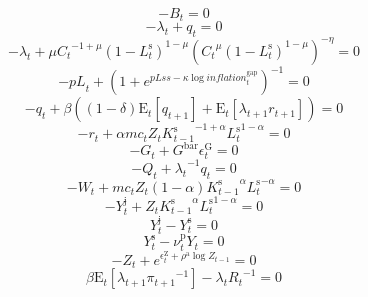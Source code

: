 \begin{equation}
-B_{t} = 0
\end{equation}
\begin{equation}
-\lambda_{t} + q_{t} = 0
\end{equation}
\begin{equation}
-\lambda_{t} + {\mu} {{C_{t}}^{-1 + \mu}} {\left(1 - L^{\mathrm{s}}_{t}\right)^{1 - \mu}} {\left({{C_{t}}^{\mu}} {\left(1 - L^{\mathrm{s}}_{t}\right)^{1 - \mu}}\right)^{-\eta}} = 0
\end{equation}
\begin{equation}
-{p\!L}_{t} + \left(1 + e^{{p\!L\!s\!s} - {\kappa} {\log{{i\!n\!f\!l\!a\!t\!i\!o\!n}^{\mathrm{gap}}_{t}}}}\right)^{-1} = 0
\end{equation}
\begin{equation}
-q_{t} + {\beta} \left(\left(1 - \delta\right) {\mathrm{E}_{t}\left[q_{t+1}\right]} + \mathrm{E}_{t}\left[{\lambda_{t+1}} {r_{t+1}}\right]\right) = 0
\end{equation}
\begin{equation}
-r_{t} + {\alpha} {{m\!c}_{t}} {Z_{t}} {{K^{\mathrm{s}}_{t-1}}^{-1 + \alpha}} {{L^{\mathrm{s}}_{t}}^{1 - \alpha}} = 0
\end{equation}
\begin{equation}
-G_{t} + {G^{\mathrm{bar}}} {\epsilon^{\mathrm{G}}_{t}} = 0
\end{equation}
\begin{equation}
-Q_{t} + {\lambda_{t}}^{-1} {q_{t}} = 0
\end{equation}
\begin{equation}
-W_{t} + {{m\!c}_{t}} {Z_{t}} \left(1 - \alpha\right) {{K^{\mathrm{s}}_{t-1}}^{\alpha}} {{L^{\mathrm{s}}_{t}}^{-\alpha}} = 0
\end{equation}
\begin{equation}
-Y^{\mathrm{j}}_{t} + {Z_{t}} {{K^{\mathrm{s}}_{t-1}}^{\alpha}} {{L^{\mathrm{s}}_{t}}^{1 - \alpha}} = 0
\end{equation}
\begin{equation}
Y^{\mathrm{j}}_{t} - Y^{\mathrm{s}}_{t} = 0
\end{equation}
\begin{equation}
Y^{\mathrm{s}}_{t} - {\nu^{\mathrm{p}}_{t}} {Y_{t}} = 0
\end{equation}
\begin{equation}
-Z_{t} + e^{\epsilon^{\mathrm{Z}}_{t} + {\rho^{\mathrm{a}}} {\log{Z_{t-1}}}} = 0
\end{equation}
\begin{equation}
{\beta} {\mathrm{E}_{t}\left[{\lambda_{t+1}} {\pi_{t+1}}^{-1}\right]} - {\lambda_{t}} {R_{t}}^{-1} = 0
\end{equation}

